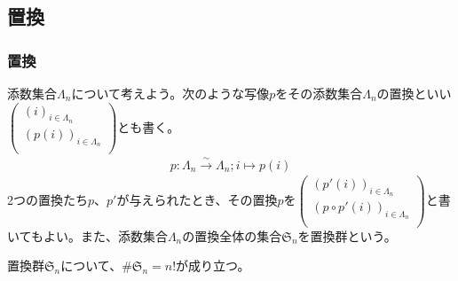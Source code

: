 \documentclass[dvipdfmx]{jsarticle}
\begin{document}
\subsection{置換}%
\subsubsection{置換}%
\begin{dfn}
添数集合$\varLambda_{n}$について考えよう。次のような写像$p$をその添数集合$\varLambda_{n}$の置換といい$\begin{pmatrix}
(i)_{i \in \varLambda_{n}} \\
\left( p(i) \right)_{i \in \varLambda_{n}} \\
\end{pmatrix}$とも書く。
\begin{align*}
p:\varLambda_{n}\overset{\sim}{\rightarrow}\varLambda_{n};i \mapsto p(i)
\end{align*}
2つの置換たち$p$、$p'$が与えられたとき、その置換$p$を$\begin{pmatrix}
\left( p'(i) \right)_{i \in \varLambda_{n}} \\
\left( p \circ p'(i) \right)_{i \in \varLambda_{n}} \\
\end{pmatrix}$と書いてもよい。また、添数集合$\varLambda_{n}$の置換全体の集合$\mathfrak{S}_{n}$を置換群という。
\end{dfn}
\begin{thm}\label{2.1.10.1}
置換群$\mathfrak{S}_{n}$について、${\#}\mathfrak{S}_{n} = n!$が成り立つ。
\end{thm}
\end{document}
